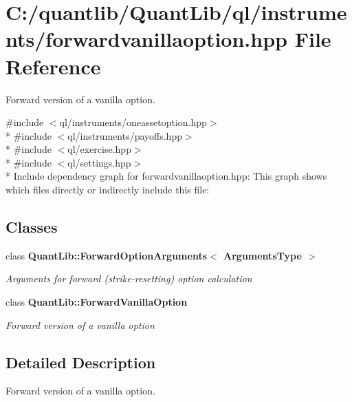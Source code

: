 \section{C\+:/quantlib/\+Quant\+Lib/ql/instruments/forwardvanillaoption.hpp File Reference}
\label{forwardvanillaoption_8hpp}


Forward version of a vanilla option.  


{\ttfamily \#include $<$ql/instruments/oneassetoption.\+hpp$>$}\\*
{\ttfamily \#include $<$ql/instruments/payoffs.\+hpp$>$}\\*
{\ttfamily \#include $<$ql/exercise.\+hpp$>$}\\*
{\ttfamily \#include $<$ql/settings.\+hpp$>$}\\*
Include dependency graph for forwardvanillaoption.\+hpp\+:
This graph shows which files directly or indirectly include this file\+:
\subsection*{Classes}
\begin{DoxyCompactItemize}
\item 
class {\bf Quant\+Lib\+::\+Forward\+Option\+Arguments$<$ Arguments\+Type $>$}
\begin{DoxyCompactList}\small\item\em Arguments for forward (strike-\/resetting) option calculation \end{DoxyCompactList}\item 
class {\bf Quant\+Lib\+::\+Forward\+Vanilla\+Option}
\begin{DoxyCompactList}\small\item\em Forward version of a vanilla option \end{DoxyCompactList}\end{DoxyCompactItemize}


\subsection{Detailed Description}
Forward version of a vanilla option. 

